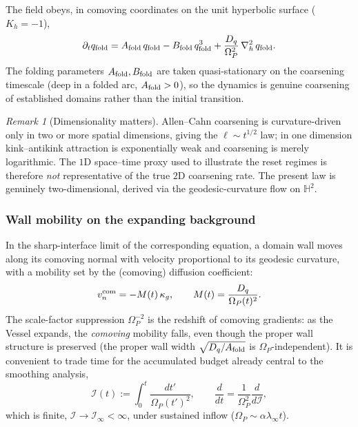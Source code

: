 \documentclass[11pt,a4paper]{article}
\newcommand{\Op}{\Omega_P}
\newcommand{\Hh}{\mathbb{H}^2}
\newcommand{\laph}{\nabla_h^2}
\newcommand{\qf}{q_{\rm fold}}
\newcommand{\Af}{A_{\rm fold}}
\newcommand{\Bf}{B_{\rm fold}}
\newcommand{\Dq}{D_q}
\newcommand{\Ibud}{\mathcal I}
\theoremstyle{plain}
\theoremstyle{definition}
\theoremstyle{remark}
\newtheorem{remark}{Remark}[section]
\begin{document}
The field obeys, in comoving coordinates on the unit hyperbolic surface ($K_h=-1$),
\begin{equation}
\partial_t\qf=\Af\,\qf-\Bf\,\qf^{3}+\frac{\Dq}{\Op^{2}}\,\laph\,\qf .
\end{equation}
The folding parameters $\Af,\Bf$ are taken quasi-stationary on the coarsening timescale (deep in a folded
arc, $\Af>0$), so the dynamics is genuine coarsening of established domains rather than the initial
transition.

\begin{remark}[Dimensionality matters]
Allen--Cahn coarsening is curvature-driven only in two or more spatial dimensions, giving the
$\ell\sim t^{1/2}$ law; in one dimension kink--antikink attraction is exponentially weak and coarsening is
merely logarithmic. The $1$D space--time proxy used to illustrate the reset regimes is therefore
\emph{not} representative of the true $2$D coarsening rate. The present law is genuinely two-dimensional,
derived via the geodesic-curvature flow on $\Hh$.
\end{remark}

\subsubsection{Wall mobility on the expanding background}

In the sharp-interface limit of the corresponding equation, a domain wall moves along its comoving normal with velocity
proportional to its geodesic curvature, with a mobility set by the (comoving) diffusion coefficient:
\begin{equation}
v_n^{\rm com}=-M(t)\,\kappa_g,
\qquad
M(t)=\frac{\Dq}{\Op(t)^{2}} .
\end{equation}
The scale-factor suppression $\Op^{-2}$ is the redshift of comoving gradients: as the Vessel expands, the
\emph{comoving} mobility falls, even though the proper wall structure is preserved (the proper wall width
$\sqrt{\Dq/\Af}$ is $\Op$-independent). It is convenient to trade time for the accumulated
budget already central to the smoothing analysis,
\begin{equation}
\Ibud(t):=\int_0^t\frac{dt'}{\Op(t')^{2}},
\qquad
\frac{d}{dt}=\frac{1}{\Op^2}\frac{d}{d\Ibud},
\end{equation}
which is finite, $\Ibud\to\Ibud_\infty<\infty$, under sustained inflow ($\Op\sim\alpha\lambda_\infty t$).

\end{document}
